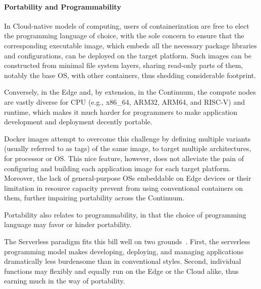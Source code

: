 \paragraph{Portability and Programmability}
In Cloud-native models of computing, users of containerization are free to elect the programming language of choice, with the sole concern to ensure that the corresponding executable image, which embeds all the necessary package libraries and configurations, can be deployed on the target platform. 
Such images can be constructed from minimal file system layers, sharing read-only parts of them, notably the base OS, with other containers, thus shedding considerable footprint. 

Conversely, in the Edge and, by extension, in the Continuum, the compute nodes are vastly diverse for CPU (e.g., x86\_64, ARM32, ARM64, and RISC-V) and runtime, which makes it much harder for programmers to make application development and deployment decently portable. 

Docker images attempt to overcome this challenge by defining multiple variants (usually referred to as tags) of the same image, to target multiple architectures, for processor or OS. 
This nice feature, however, does not alleviate the pain of configuring and building each application image for each target platform. Moreover, the lack of general-purpose OSs embeddable on Edge devices or their limitation in resource capacity prevent from using conventional containers on them, further impairing portability across the Continuum.

Portability also relates to programmability, in that the choice of programming language may favor or hinder portability. 

The Serverless paradigm fits this bill well on two grounds~\cite{yi2017lavea}. First, the serverless programming model makes  developing, deploying, and managing applications dramatically less burdensome than in conventional styles.
Second, individual functions may flexibly and equally run on the Edge or the Cloud alike, thus earning much in the way of portability.

